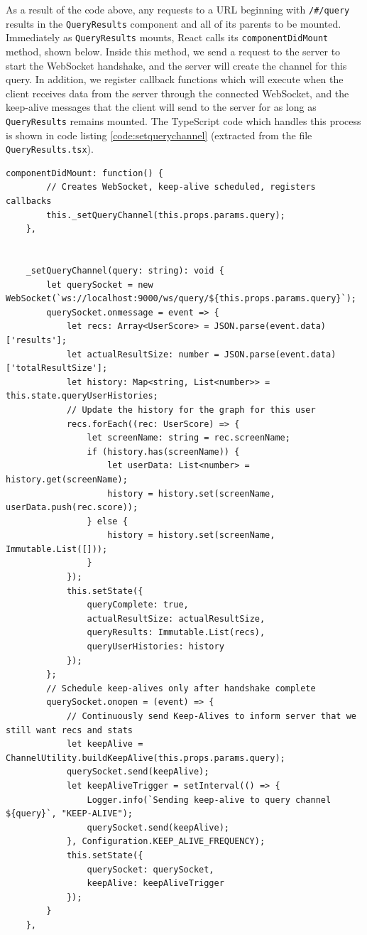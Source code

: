 \documentclass{l4proj}
\newcommand{\code}[1]{\texttt{#1}}
\begin{document}
As a result of the code above, any requests to a URL beginning with \code{/\#/query} results in the \code{QueryResults} component and all of its parents to be mounted. Immediately as \code{QueryResults} mounts, React calls its \code{componentDidMount} method, shown below. Inside this method, we send a request to the server to start the WebSocket handshake, and the server will create the channel for this query. In addition, we register callback functions which will execute when the client receives data from the server through the connected WebSocket, and the keep-alive messages that the client will send to the server for as long as \code{QueryResults} remains mounted. The TypeScript code which handles this process is shown in code listing \ref{code:setquerychannel} (extracted from the file \code{QueryResults.tsx}).

\begin{lstlisting}[caption=The method called by React when a new component mounts.,label=code:setquerychannel]
    componentDidMount: function() {
        // Creates WebSocket, keep-alive scheduled, registers callbacks
        this._setQueryChannel(this.props.params.query);
    },


    _setQueryChannel(query: string): void {
        let querySocket = new WebSocket(`ws://localhost:9000/ws/query/${this.props.params.query}`);
        querySocket.onmessage = event => {
            let recs: Array<UserScore> = JSON.parse(event.data)['results'];
            let actualResultSize: number = JSON.parse(event.data)['totalResultSize'];
            let history: Map<string, List<number>> = this.state.queryUserHistories;
            // Update the history for the graph for this user
            recs.forEach((rec: UserScore) => {
                let screenName: string = rec.screenName;
                if (history.has(screenName)) {
                    let userData: List<number> = history.get(screenName);
                    history = history.set(screenName, userData.push(rec.score));
                } else {
                    history = history.set(screenName, Immutable.List([]));
                }
            });
            this.setState({
                queryComplete: true,
                actualResultSize: actualResultSize,
                queryResults: Immutable.List(recs),
                queryUserHistories: history
            });
        };
        // Schedule keep-alives only after handshake complete
        querySocket.onopen = (event) => {
            // Continuously send Keep-Alives to inform server that we still want recs and stats
            let keepAlive = ChannelUtility.buildKeepAlive(this.props.params.query);
            querySocket.send(keepAlive);
            let keepAliveTrigger = setInterval(() => {
                Logger.info(`Sending keep-alive to query channel ${query}`, "KEEP-ALIVE");
                querySocket.send(keepAlive);
            }, Configuration.KEEP_ALIVE_FREQUENCY);
            this.setState({
                querySocket: querySocket,
                keepAlive: keepAliveTrigger
            });
        }
    },

\end{lstlisting}
        
\end{document}
